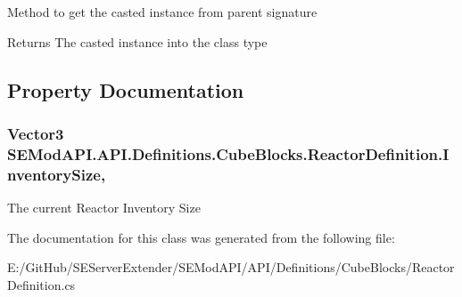 Method to get the casted instance from parent signature 

\begin{DoxyReturn}{Returns}
The casted instance into the class type
\end{DoxyReturn}


\subsection{Property Documentation}
\hypertarget{class_s_e_mod_a_p_i_1_1_a_p_i_1_1_definitions_1_1_cube_blocks_1_1_reactor_definition_a362dcfc9e823b90db5c825b1b4826fa2}{}
\subsubsection[{Inventory\+Size}]{\setlength{\rightskip}{0pt plus 5cm}Vector3 S\+E\+Mod\+A\+P\+I.\+A\+P\+I.\+Definitions.\+Cube\+Blocks.\+Reactor\+Definition.\+Inventory\+Size\hspace{0.3cm}{\ttfamily [get]}, {\ttfamily [set]}}\label{class_s_e_mod_a_p_i_1_1_a_p_i_1_1_definitions_1_1_cube_blocks_1_1_reactor_definition_a362dcfc9e823b90db5c825b1b4826fa2}


The current Reactor Inventory Size 



The documentation for this class was generated from the following file\+:\begin{DoxyCompactItemize}
\item 
E\+:/\+Git\+Hub/\+S\+E\+Server\+Extender/\+S\+E\+Mod\+A\+P\+I/\+A\+P\+I/\+Definitions/\+Cube\+Blocks/Reactor\+Definition.\+cs\end{DoxyCompactItemize}
